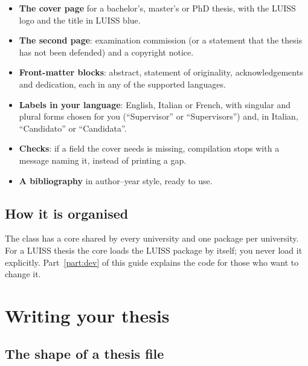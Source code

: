 \documentclass[11pt,a4paper,oneside]{report}
\begin{document}
\begin{itemize}
  \item \textbf{The cover page} for a bachelor's, master's or PhD thesis,
    with the LUISS logo and the title in LUISS blue.
  \item \textbf{The second page}: examination commission (or a statement
    that the thesis has not been defended) and a copyright notice.
  \item \textbf{Front-matter blocks}: abstract, statement of originality,
    acknowledgements and dedication, each in any of the supported
    languages.
  \item \textbf{Labels in your language}: English, Italian or French,
    with singular and plural forms chosen for you (``Supervisor'' or
    ``Supervisors'') and, in Italian, ``Candidato'' or ``Candidata''.
  \item \textbf{Checks}: if a field the cover needs is missing, compilation
    stops with a message naming it, instead of printing a gap.
  \item \textbf{A bibliography} in author--year style, ready to use.
\end{itemize}

\section{How it is organised}

The class has a core shared by every university and one package per
university. For a LUISS thesis the core loads the LUISS package by itself;
you never load it explicitly. Part~\ref{part:dev} of this guide explains
the code for those who want to change it.



\chapter{Writing your thesis}
\label{ch:writing}

\section{The shape of a thesis file}
\end{document}
